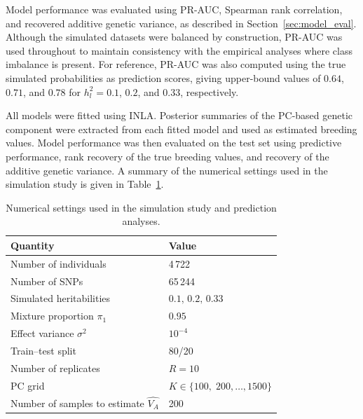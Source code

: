 Model performance was evaluated using PR-AUC, Spearman rank correlation, and recovered additive genetic variance, as described in Section~\ref{sec:model_eval}. Although the simulated datasets were balanced by construction, PR-AUC was used throughout to maintain consistency with the empirical analyses where class imbalance is present. For reference, PR-AUC was also computed using the true simulated probabilities as prediction scores, giving upper-bound values of $0.64$, $0.71$, and $0.78$ for $h^2_l = 0.1$, $0.2$, and $0.33$, respectively.

All models were fitted using INLA. Posterior summaries of the PC-based genetic component were extracted from each fitted model and used as estimated breeding values. Model performance was then evaluated on the test set using predictive performance, rank recovery of the true breeding values, and recovery of the additive genetic variance. A summary of the numerical settings used in the simulation study is given in Table~\ref{tab:simulation_settings}.

\begin{table}[h!]
\centering
\caption{Numerical settings used in the simulation study and prediction analyses.}
\vspace{6pt}
\label{tab:simulation_settings}
\begin{tabular}{l   l}
\hline
\textbf{Quantity} & \textbf{Value} \\
\hline
Number of individuals & 4\,722 \\
Number of SNPs & 65\,244 \\
Simulated heritabilities \hspace{1cm} & $0.1, \, 0.2, \, 0.33$ \\
Mixture proportion $\pi_1$ & $0.95$ \\
Effect variance $\sigma^2$ & $10^{-4}$ \\
Train--test split & 80/20  \\
Number of replicates & $R = 10$ \\
PC grid & $K \in \{100,\;200,\dots,1500\}$ \\
Number of samples to estimate $\hat{V_A}$ & 200 \\
\hline
\end{tabular}
\end{table}


